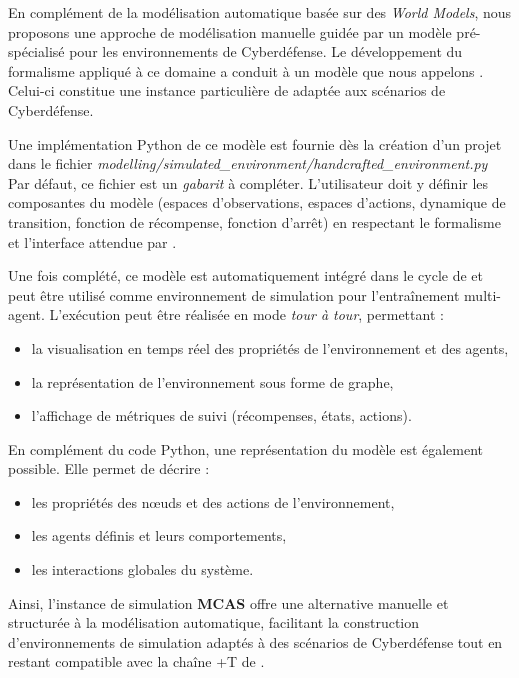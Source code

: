 En complément de la modélisation automatique basée sur des \textit{World Models}, nous proposons une approche de modélisation manuelle guidée par un modèle pré-spécialisé pour les environnements de Cyberdéfense.
Le développement du formalisme  appliqué à ce domaine a conduit à un modèle que nous appelons . Celui-ci constitue une instance particulière de  adaptée aux scénarios de Cyberdéfense.

Une implémentation Python de ce modèle est fournie dès la création d'un projet dans le fichier
\textit{modelling/simulated\_environment/handcrafted\_environment.py}
Par défaut, ce fichier est un \textit{gabarit} à compléter. L'utilisateur doit y définir les composantes du modèle (espaces d'observations, espaces d'actions, dynamique de transition, fonction de récompense, fonction d'arrêt) en respectant le formalisme  et l'interface attendue par .


Une fois complété, ce modèle est automatiquement intégré dans le cycle de  et peut être utilisé comme environnement de simulation pour l'entraînement multi-agent. L'exécution peut être réalisée en mode \textit{tour à tour}, permettant :
\begin{itemize}
  \item la visualisation en temps réel des propriétés de l'environnement et des agents,
  \item la représentation de l'environnement sous forme de graphe,
  \item l'affichage de métriques de suivi (récompenses, états, actions).
\end{itemize}
En complément du code Python, une représentation  du modèle est également possible. Elle permet de décrire :
\begin{itemize}
  \item les propriétés des nœuds et des actions de l'environnement,
  \item les agents définis et leurs comportements,
  \item les interactions globales du système.
\end{itemize}

\medskip
Ainsi, l'instance de simulation \textbf{MCAS} offre une alternative manuelle et structurée à la modélisation automatique, facilitant la construction d'environnements de simulation adaptés à des scénarios de Cyberdéfense tout en restant compatible avec la chaîne +T de .

